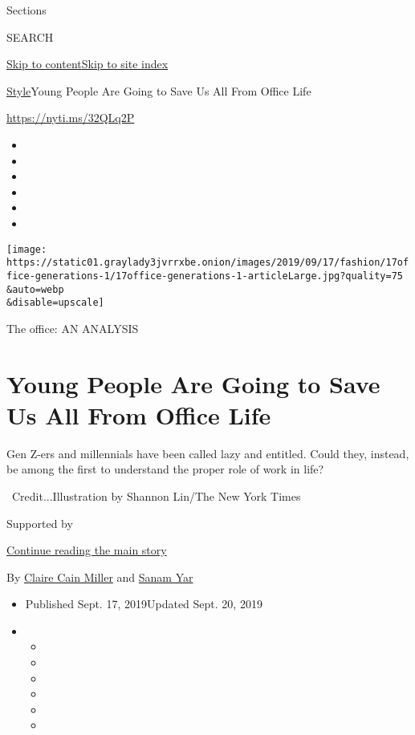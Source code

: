 Sections

SEARCH

\protect\hyperlink{site-content}{Skip to
content}\protect\hyperlink{site-index}{Skip to site index}

\href{/section/style}{Style}\textbar{}Young People Are Going to Save Us
All From Office Life

\href{https://nyti.ms/32QLq2P}{https://nyti.ms/32QLq2P}

\begin{itemize}
\item
\item
\item
\item
\item
\item
\end{itemize}

\texttt{[image: https://static01.graylady3jvrrxbe.onion/images/2019/09/17/fashion/17office-generations-1/17office-generations-1-articleLarge.jpg?quality=75\\\&auto=webp\\\&disable=upscale]}

The office: AN ANALYSIS

\hypertarget{young-people-are-going-to-save-us-all-from-office-life}{%
\section{Young People Are Going to Save Us All From Office
Life}\label{young-people-are-going-to-save-us-all-from-office-life}}

Gen Z-ers and millennials have been called lazy and entitled. Could
they, instead, be among the first to understand the proper role of work
in life?

~Credit...Illustration by Shannon Lin/The New York Times

Supported by

\protect\hyperlink{after-sponsor}{Continue reading the main story}

By
\href{https://www.nytimes3xbfgragh.onion/by/claire-cain-miller}{Claire
Cain Miller} and
\href{https://www.nytimes3xbfgragh.onion/by/sanam-yar}{Sanam Yar}

\begin{itemize}
\item
  Published Sept. 17, 2019Updated Sept. 20, 2019
\item
  \begin{itemize}
  \item
  \item
  \item
  \item
  \item
  \item
  \end{itemize}
\end{itemize}

